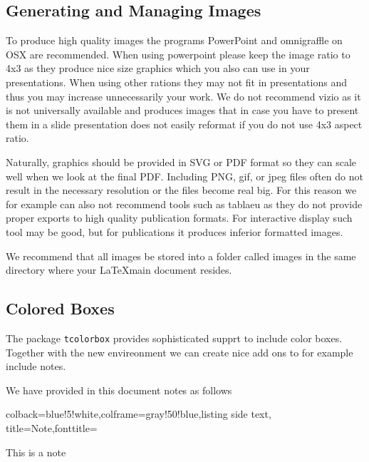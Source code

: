 \subsection{Generating and Managing Images}\label{generating-images}

To produce high quality images the programs PowerPoint and omnigraffle
on OSX are recommended. When using powerpoint please keep the image
ratio to 4x3 as they produce nice size graphics which you also can use
in your presentations. When using other rations they may not fit in
presentations and thus you may increase unnecessarily your work. We do
not recommend vizio as it is not universally available and produces
images that in case you have to present them in a slide presentation
does not easily reformat if you do not use 4x3 aspect ratio.

Naturally, graphics should be provided in SVG or PDF format so they can
scale well when we look at the final PDF. Including PNG, gif, or jpeg
files often do not result in the necessary resolution or the files
become real big. For this reason we for example can also not recommend
tools such as tablaeu as they do not provide proper exports to high
quality publication formats. For interactive display such tool may be
good, but for publications it produces inferior formatted images.

We recommend that all images be stored into a folder called images in
the same directory where your \LaTeX main document resides.



\subsection{Colored Boxes}

The package \verb|tcolorbox| provides sophisticated supprt to include
color boxes. Together with the new envireonment we can create nice add
ons to for example include notes.


We have provided in this document notes as follows


\begin{tcblisting}{colback=blue!5!white,colframe=gray!50!blue,listing side text,  title=Note,fonttitle=\bfseries}
\begin{NOTE}
This is a note
\end{NOTE}
\end{tcblisting}


